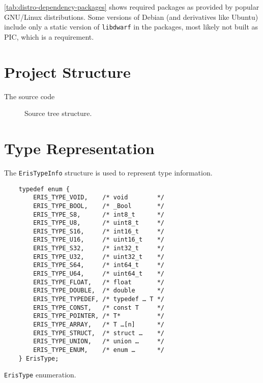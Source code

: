 \autoref{tab:distro-dependency-packages} shows required packages as provided
by popular GNU/Linux distributions. Some versions of Debian (and derivatives
like Ubuntu) include only a static version of \verb|libdwarf| in the packages,
most likely not built as \gls{PIC}, which is a requirement.

\section{Project Structure}

The \Eris* source code

\begin{figure}[h]
    \centering
    \noindent\begin{minipage}{0.75\textwidth}
    \end{minipage}
    \caption{Source tree structure.}
\end{figure}


\section{Type Representation}

The \texttt{ErisTypeInfo} structure is used to represent type information.

\begin{listing}
    \centering
    \begin{verbatim}
	typedef enum {
	    ERIS_TYPE_VOID,    /* void        */
	    ERIS_TYPE_BOOL,    /* _Bool       */
	    ERIS_TYPE_S8,      /* int8_t      */
	    ERIS_TYPE_U8,      /* uint8_t     */
	    ERIS_TYPE_S16,     /* int16_t     */
	    ERIS_TYPE_U16,     /* uint16_t    */
	    ERIS_TYPE_S32,     /* int32_t     */
	    ERIS_TYPE_U32,     /* uint32_t    */
	    ERIS_TYPE_S64,     /* int64_t     */
	    ERIS_TYPE_U64,     /* uint64_t    */
	    ERIS_TYPE_FLOAT,   /* float       */
	    ERIS_TYPE_DOUBLE,  /* double      */
	    ERIS_TYPE_TYPEDEF, /* typedef … T */
	    ERIS_TYPE_CONST,   /* const T     */
	    ERIS_TYPE_POINTER, /* T*          */
	    ERIS_TYPE_ARRAY,   /* T …[n]      */
	    ERIS_TYPE_STRUCT,  /* struct …    */
	    ERIS_TYPE_UNION,   /* union …     */
	    ERIS_TYPE_ENUM,    /* enum …      */
	} ErisType;
    \end{verbatim}
    \caption{\texttt{ErisType} enumeration.}
    \label{lst:ErisType}
\end{listing}

